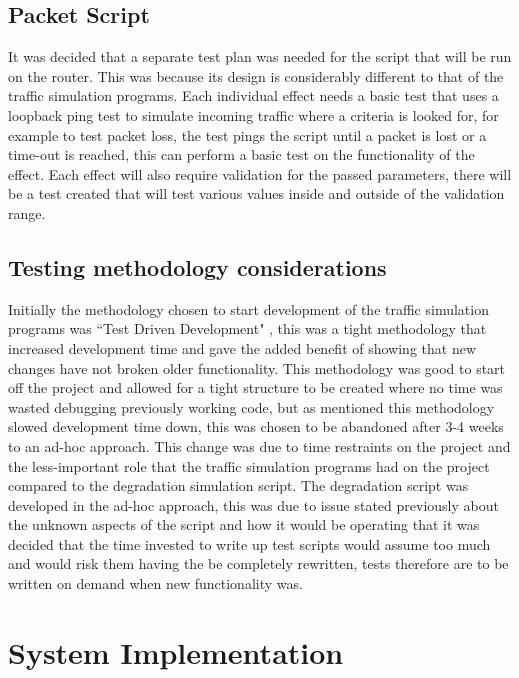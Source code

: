 \subsection{Packet Script}
It was decided that a separate test plan was needed for the script that will be run on the router. This was because its design is considerably different to that of the traffic simulation programs. Each individual effect needs a basic test that uses a loopback ping test to simulate incoming traffic where a criteria is looked for, for example to test packet loss, the test pings the script until a packet is lost or a time-out is reached, this can perform a basic test on the functionality of the effect. Each effect will also require validation for the passed parameters, there will be a test created that will test various values inside and outside of the validation range.

\subsection{Testing methodology considerations}
Initially the methodology chosen to start development of the traffic simulation programs was ``Test Driven Development" \citep{beck2003test}, this was a tight methodology that increased development time and gave the added benefit of showing that new changes have not broken older functionality. This methodology was good to start off the project and allowed for a tight structure to be created where no time was wasted debugging previously working code, but as mentioned this methodology slowed development time down, this was chosen to be abandoned after 3-4 weeks to an ad-hoc approach. 
This change was due to time restraints on the project and the less-important role that the traffic simulation programs had on the project compared to the degradation simulation script. The degradation script was developed in the ad-hoc approach, this was due to issue stated previously about the unknown aspects of the script and how it would be operating that it was decided that the time invested to write up test scripts would assume too much and would risk them having the be completely rewritten, tests therefore are to be written on demand when new functionality was.

\section{System Implementation}

